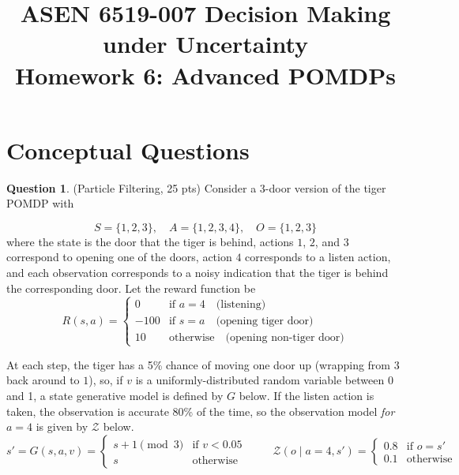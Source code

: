 \documentclass{article}
\title{ASEN 6519-007 Decision Making under Uncertainty\\
       Homework 6: Advanced POMDPs}
\theoremstyle{definition}
\newtheorem{question}[thm]{Question}
\begin{document}
\maketitle

\section{Conceptual Questions}

\begin{question}
    (Particle Filtering, 25 pts) Consider a 3-door version of the tiger POMDP with

\begin{equation*}
S = \{1,2,3\},\quad A = \{1,2,3,4\},\quad O = \{1,2,3\}
\end{equation*}
where the state is the door that the tiger is behind, actions $1$, $2$, and $3$ correspond to opening one of the doors, action $4$ corresponds to a listen action, and each observation corresponds to a noisy indication that the tiger is behind the corresponding door.
Let the reward function be
\begin{equation*}
R(s, a) = \begin{cases}
    0    & \text{if } a = 4 \quad \text{(listening)}\\
    -100 & \text{if } s = a \quad \text{(opening tiger door)}\\
    10   & \text{otherwise} \quad \text{(opening non-tiger door)}
\end{cases}
\end{equation*}

At each step, the tiger has a 5\% chance of moving one door up (wrapping from $3$ back around to $1$), so, if $v$ is a uniformly-distributed random variable between 0 and 1, a state generative model is defined by $G$ below. If the listen action is taken, the observation is accurate 80\% of the time, so the observation model \emph{for $a=4$} is given by $\mathcal{Z}$ below.
\begin{equation} \label{eq:model}
    s' = G(s, a, v) = \begin{cases}
        s+1 \pmod 3 & \text{if } v < 0.05 \\
        s & \text{otherwise}
    \end{cases} \hspace{1cm}
    \mathcal{Z}(o \mid a=4, s') = \begin{cases}
        0.8 & \text{if } o = s' \\
        0.1 & \text{otherwise}
    \end{cases}
\end{equation}


\end{question}
\end{document}
